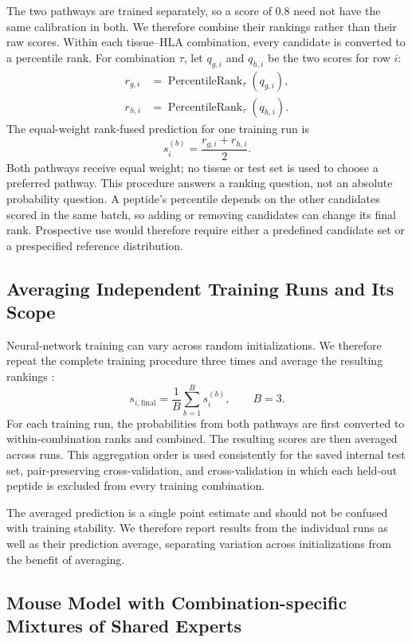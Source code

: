 The two pathways are trained separately, so a score of 0.8 need not have the same calibration in both. We therefore combine their rankings rather than their raw scores. Within each tissue--HLA combination, every candidate is converted to a percentile rank. For combination \(\tau\), let \(q_{g,i}\) and \(q_{h,i}\) be the two scores for row \(i\):
\[
\begin{aligned}
r_{g,i}
&=
\operatorname{PercentileRank}_{\tau}(q_{g,i}),\\
r_{h,i}
&=
\operatorname{PercentileRank}_{\tau}(q_{h,i}).
\end{aligned}
\]
The equal-weight rank-fused prediction for one training run is
\[
s_i^{(b)}
=
\frac{r_{g,i}+r_{h,i}}{2}.
\]
Both pathways receive equal weight; no tissue or test set is used to choose a preferred pathway. This procedure answers a ranking question, not an absolute probability question. A peptide's percentile depends on the other candidates scored in the same batch, so adding or removing candidates can change its final rank. Prospective use would therefore require either a predefined candidate set or a prespecified reference distribution.

\subsection{Averaging Independent Training Runs and Its Scope}

Neural-network training can vary across random initializations. We therefore repeat the complete training procedure three times and average the resulting rankings \cite{lakshminarayanan2017deep}:
\[
s_{i,\mathrm{final}}
=
\frac{1}{B}
\sum_{b=1}^{B}
s_i^{(b)},
\qquad B=3.
\]
For each training run, the probabilities from both pathways are first converted to within-combination ranks and combined. The resulting scores are then averaged across runs. This aggregation order is used consistently for the saved internal test set, pair-preserving cross-validation, and cross-validation in which each held-out peptide is excluded from every training combination.

The averaged prediction is a single point estimate and should not be confused with training stability. We therefore report results from the individual runs as well as their prediction average, separating variation across initializations from the benefit of averaging.

\subsection{Mouse Model with Combination-specific Mixtures of Shared Experts}

